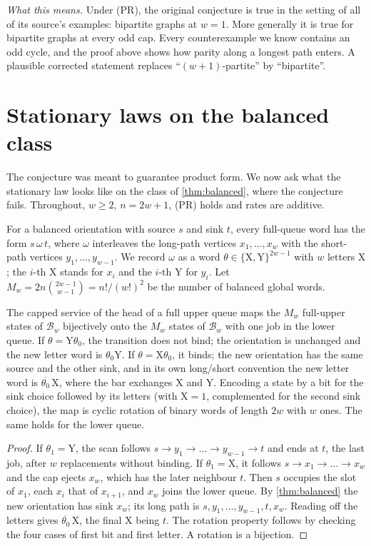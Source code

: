 \documentclass[11pt,a4paper]{article}
\theoremstyle{plain}
\theoremstyle{plain}
\newcommand{\Bal}{\mathcal{B}}
\newcommand{\what}[1]{\par\smallskip\noindent\textit{What this means.} #1\par\smallskip}
\begin{document}
\what{Under (PR), the original conjecture is true in the setting of all of its source's examples: bipartite graphs at $w=1$. More generally it is true for bipartite graphs at every odd cap. Every counterexample we know contains an odd cycle, and the proof above shows how parity along a longest path enters. A plausible corrected statement replaces ``$(w+1)$-partite'' by ``bipartite''.}

\section{Stationary laws on the balanced class}\label{sec:stationary}

The conjecture was meant to guarantee product form. We now ask what the stationary law looks like on the class of \cref{thm:balanced}, where the conjecture fails. Throughout, $w\ge2$, $n=2w+1$, (PR) holds and rates are additive.

For a balanced orientation with source $s$ and sink $t$, every full-queue word has the form $s\,\omega\,t$, where $\omega$ interleaves the long-path vertices $x_1,\dots,x_w$ with the short-path vertices $y_1,\dots,y_{w-1}$. We record $\omega$ as a word $\theta\in\{\mathrm X,\mathrm Y\}^{2w-1}$ with $w$ letters $\mathrm X$; the $i$-th $\mathrm X$ stands for $x_i$ and the $i$-th $\mathrm Y$ for $y_i$. Let $M_w=2n\binom{2w-1}{w-1}=n!/(w!)^2$ be the number of balanced global words.

\begin{lemma}\label{lem:head}
The capped service of the head of a full upper queue maps the $M_w$ full-upper states of $\Bal_w$ bijectively onto the $M_w$ states of $\Bal_w$ with one job in the lower queue. If $\theta=\mathrm Y\theta_0$, the transition does not bind; the orientation is unchanged and the new letter word is $\theta_0\mathrm Y$. If $\theta=\mathrm X\theta_0$, it binds; the new orientation has the same source and the other sink, and in its own long/short convention the new letter word is $\overline{\theta_0}\,\mathrm X$, where the bar exchanges $\mathrm X$ and $\mathrm Y$. Encoding a state by a bit for the sink choice followed by its letters (with $\mathrm X=1$, complemented for the second sink choice), the map is cyclic rotation of binary words of length $2w$ with $w$ ones. The same holds for the lower queue.
\end{lemma}

\begin{proof}
If $\theta_1=\mathrm Y$, the scan follows $s\to y_1\to\dots\to y_{w-1}\to t$ and ends at $t$, the last job, after $w$ replacements without binding. If $\theta_1=\mathrm X$, it follows $s\to x_1\to\dots\to x_w$ and the cap ejects $x_w$, which has the later neighbour $t$. Then $s$ occupies the slot of $x_1$, each $x_i$ that of $x_{i+1}$, and $x_w$ joins the lower queue. By \cref{thm:balanced} the new orientation has sink $x_w$; its long path is $s,y_1,\dots,y_{w-1},t,x_w$. Reading off the letters gives $\overline{\theta_0}\,\mathrm X$, the final $\mathrm X$ being $t$. The rotation property follows by checking the four cases of first bit and first letter. A rotation is a bijection.
\end{proof}
\end{document}
